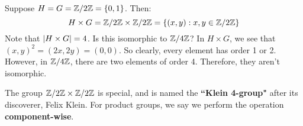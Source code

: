 \begin{xmp}[source=Primary Source Material]
    Suppose $ H = G = \mathbb{Z}/2\mathbb{Z} = \left\{{0, 1}\right\} $. Then:
    \begin{equation*}
        H \times G = \mathbb{Z}/2\mathbb{Z} \times \mathbb{Z}/2\mathbb{Z} = \left\{{(x, y) : x, y \in \mathbb{Z}/2\mathbb{Z}}\right\}
    \end{equation*}
    Note that $ \abs{H \times G} = 4 $. Is this isomorphic to $ \mathbb{Z}/4\mathbb{Z} $? \vsp
    In $ H \times G $, we see that $ (x, y)^{2} = (2x, 2y) = (0, 0) $.
    So clearly, every element has order 1 or 2. \vsp
    However, in $ \mathbb{Z}/4\mathbb{Z} $, there are two elements of order 4.
    Therefore, they aren't isomorphic.
\end{xmp}

The group $ \mathbb{Z}/2\mathbb{Z} \times \mathbb{Z}/2\mathbb{Z} $ is special, and is named
the \textbf{``Klein 4-group"} after its discoverer, Felix Klein. \vsp
%
For product groups, we say we perform the operation \textbf{component-wise}.
